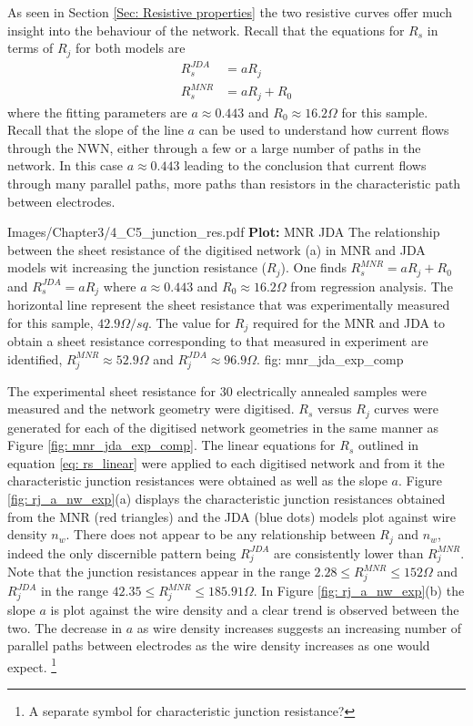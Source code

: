 As seen in Section \ref{Sec: Resistive properties} the two resistive curves offer much insight into the behaviour of the network. Recall that the equations for $R_s$ in terms of $R_j$ for both models are
\begin{align}
R_s^{JDA} &= a R_j\\
R_s^{MNR} &= a R_j+ R_0
\label{eq: rs_linear}
\end{align}
where the fitting parameters are $a \approx 0.443$ and $R_0 \approx 16.2 \Omega$ for this sample. Recall that the slope of the line $a$ can be used to understand how current flows through the NWN, either through a few or a large number of paths in the network. In this case $a \approx 0.443$ leading to the conclusion that current flows through many parallel paths, more paths than resistors in the characteristic path between electrodes. 

{Images/Chapter3/4_C5_junction_res.pdf}
{\textbf{Plot:} MNR JDA }
{The relationship between the sheet resistance of the digitised network \label{fig: digitisedNWNs}(a) in MNR and JDA models wit increasing the junction resistance ($R_j$). One finds $R_s^{MNR} = a R_j + R_0$ and $R_s^{JDA} = a R_j$ where $a \approx 0.443$ and $R_0 \approx 16.2 \Omega$ from regression analysis. The horizontal line represent the sheet resistance that was experimentally measured for this sample, $42.9 \Omega/sq$. The value for $R_j$ required for the MNR and JDA to obtain a sheet resistance corresponding to that measured in experiment are identified, $R_j^{MNR} \approx 52.9 \Omega$ and $R_j^{JDA} \approx 96.9 \Omega$.}
{fig: mnr_jda_exp_comp}

The experimental sheet resistance for 30 electrically annealed samples were measured and the network geometry were digitised. $R_s$ versus $R_j$ curves were generated for each of the digitised network geometries in the same manner as Figure \ref{fig: mnr_jda_exp_comp}. The linear equations for $R_s$ outlined in equation \ref{eq: rs_linear} were applied to each digitised network and from it the characteristic junction resistances were obtained as well as the slope $a$. Figure \ref{fig: rj_a_nw_exp}(a) displays the characteristic junction resistances obtained from the MNR (red triangles) and the JDA (blue dots) models plot against wire density $n_w$. There does not appear to be any relationship between $R_j$ and $n_w$, indeed the only discernible pattern being $R^{JDA}_j$ are consistently lower than $R^{MNR}_j$. Note that the junction resistances appear in the range $2.28\leq R^{MNR}_j \leq 152 \Omega$ and $R^{JDA}_j$ in the range $42.35 \leq R^{MNR}_j \leq 185.91 \Omega$. In Figure \ref{fig: rj_a_nw_exp}(b) the slope $a$ is plot against the wire density and a clear trend is observed between the two. The decrease in $a$ as wire density increases suggests an increasing number of parallel paths between electrodes as the wire density increases as one would expect. \footnote{A separate symbol for characteristic junction resistance?}

